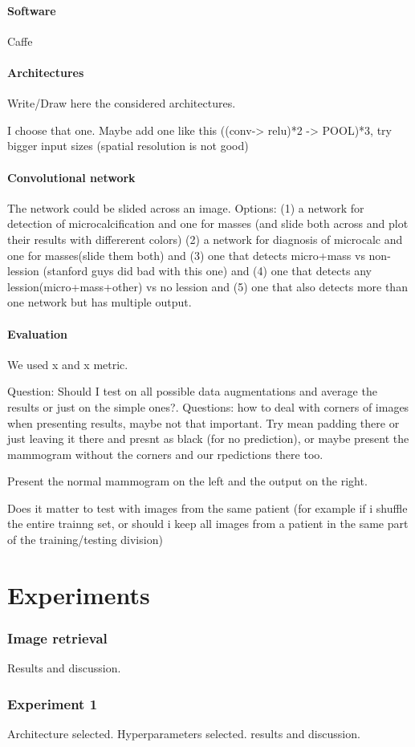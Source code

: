\documentclass[11pt]{article}
\begin{document}
	\subsection{Software}
	Caffe

	\subsection{Architectures}
	Write/Draw here the considered architectures.

	I choose that one. Maybe add one like this ((conv-> relu)*2 -> POOL)*3, try bigger input sizes (spatial resolution is not good)

	\subsection{Convolutional network}
	The network could be slided across an image. Options: (1) a network for detection of microcalcification and one for masses (and slide both across and plot their results with differerent colors) (2) a network for diagnosis of microcalc and one for masses(slide them both) and (3) one that detects micro+mass vs non-lession (stanford guys did bad with this one) and (4) one that detects any lession(micro+mass+other) vs no lession and (5) one that also detects more than one network but has multiple output.

	\subsection{Evaluation}
We used x and x metric.

	Question: Should I test on all possible data augmentations and average the results or just on the simple ones?.	
	Questions: how to deal with corners of images when presenting results, maybe not that important. Try mean padding there or just leaving it there and presnt as black (for no prediction), or maybe present the mammogram without the corners and our rpedictions there too.

	Present the normal mammogram on the left and the output on the right.

	Does it matter to test with images from the same patient (for example if i shuffle the entire trainng set, or should i keep all images from a patient in the same part of the training/testing division)
	

	\part{Experiments}
	\section{Image retrieval}
	Results and discussion.
	\section{Experiment 1}
	Architecture selected. Hyperparameters selected. results and discussion.

	
	
	
\end{document}
